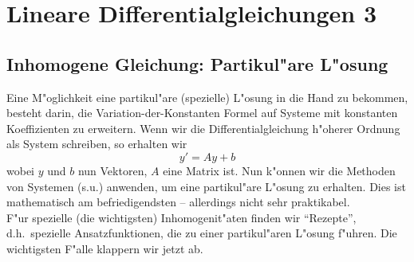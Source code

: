  


\section{Lineare Differentialgleichungen 3}
\subsection{Inhomogene Gleichung:  Partikul"are L"osung}
Eine M"oglichkeit eine partikul"are (spezielle) L"osung in die Hand zu bekommen, besteht darin,
die Variation-der-Konstanten Formel auf Systeme mit konstanten Koeffizienten zu erweitern.
Wenn wir die Differentialgleichung h"oherer Ordnung als System schreiben, so erhalten wir
$$ y' = A y+ b$$
wobei $y$ und $b$ nun Vektoren, $A$ eine Matrix ist. Nun k"onnen wir die Methoden von Systemen
(s.u.) anwenden, um  eine partikul"are L"osung zu erhalten. Dies ist mathematisch am befriedigendsten -- allerdings nicht sehr praktikabel.\\
F"ur spezielle (die wichtigsten) Inhomogenit"aten finden wir ``Rezepte'', d.h.\ spezielle Ansatzfunktionen,
die zu einer partikul"aren L"osung f"uhren. Die wichtigsten F"alle klappern wir jetzt ab. 

